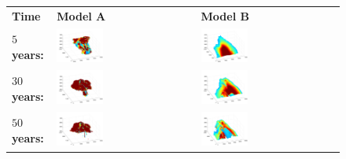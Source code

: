 \begin{figure}
\begin{tabular}{MMM}
\textbf{Time} & \textbf{Model A} & \textbf{Model B}\\
\textbf{$5$ years:}&
\includegraphics[width=0.35\textwidth]{./figurer/C02222c5_pers}&
\includegraphics[width=0.35\textwidth]{./figurer/C03211c5_pers}\\
\textbf{$30$ years:}&
\includegraphics[width=0.35\textwidth]{./figurer/C02222c30_pers}&
\includegraphics[width=0.35\textwidth]{./figurer/C03211c30_pers}\\
\textbf{$50$ years:}&
\includegraphics[width=0.35\textwidth]{./figurer/C02222c50_pers}&
\includegraphics[width=0.35\textwidth]{./figurer/C03211c50_pers}\\

\end{tabular}
\end{figure}
